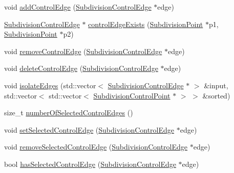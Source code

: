 \begin{DoxyCompactItemize}
\item 
void \hyperlink{classShipCADGeometry_1_1SubdivisionSurface_a1f5ab04c4543f5084c1190fd788d8f63}{add\-Control\-Edge} (\hyperlink{classShipCADGeometry_1_1SubdivisionControlEdge}{Subdivision\-Control\-Edge} $\ast$edge)
\item 
\hyperlink{classShipCADGeometry_1_1SubdivisionControlEdge}{Subdivision\-Control\-Edge} $\ast$ \hyperlink{classShipCADGeometry_1_1SubdivisionSurface_a6a89be4440e3adfcb0b14c164db891ae}{control\-Edge\-Exists} (\hyperlink{classShipCADGeometry_1_1SubdivisionPoint}{Subdivision\-Point} $\ast$p1, \hyperlink{classShipCADGeometry_1_1SubdivisionPoint}{Subdivision\-Point} $\ast$p2)
\item 
void \hyperlink{classShipCADGeometry_1_1SubdivisionSurface_a3aac4d6c8ad638234f88fb8b1ffa00cb}{remove\-Control\-Edge} (\hyperlink{classShipCADGeometry_1_1SubdivisionControlEdge}{Subdivision\-Control\-Edge} $\ast$edge)
\item 
void \hyperlink{classShipCADGeometry_1_1SubdivisionSurface_ae45fc2694977c8fbae54ac2e0e067d1f}{delete\-Control\-Edge} (\hyperlink{classShipCADGeometry_1_1SubdivisionControlEdge}{Subdivision\-Control\-Edge} $\ast$edge)
\item 
void \hyperlink{classShipCADGeometry_1_1SubdivisionSurface_a975c97ca338eb2aaaa3dcc0640611a95}{isolate\-Edges} (std\-::vector$<$ \hyperlink{classShipCADGeometry_1_1SubdivisionControlEdge}{Subdivision\-Control\-Edge} $\ast$ $>$ \&input, std\-::vector$<$ std\-::vector$<$ \hyperlink{classShipCADGeometry_1_1SubdivisionControlPoint}{Subdivision\-Control\-Point} $\ast$ $>$ $>$ \&sorted)
\item 
size\-\_\-t \hyperlink{classShipCADGeometry_1_1SubdivisionSurface_ad414c410701ec58b0e3d064394fc4ddf}{number\-Of\-Selected\-Control\-Edges} ()
\item 
void \hyperlink{classShipCADGeometry_1_1SubdivisionSurface_ae1ceb8323935d0734fe4dc9c324aca16}{set\-Selected\-Control\-Edge} (\hyperlink{classShipCADGeometry_1_1SubdivisionControlEdge}{Subdivision\-Control\-Edge} $\ast$edge)
\item 
void \hyperlink{classShipCADGeometry_1_1SubdivisionSurface_a579077d742f9afc4e1d4ad20ef5a2184}{remove\-Selected\-Control\-Edge} (\hyperlink{classShipCADGeometry_1_1SubdivisionControlEdge}{Subdivision\-Control\-Edge} $\ast$edge)
\item 
bool \hyperlink{classShipCADGeometry_1_1SubdivisionSurface_a3f7856ea95b0c881a1171845c1dc817e}{has\-Selected\-Control\-Edge} (\hyperlink{classShipCADGeometry_1_1SubdivisionControlEdge}{Subdivision\-Control\-Edge} $\ast$edge)

\end{DoxyCompactItemize}
